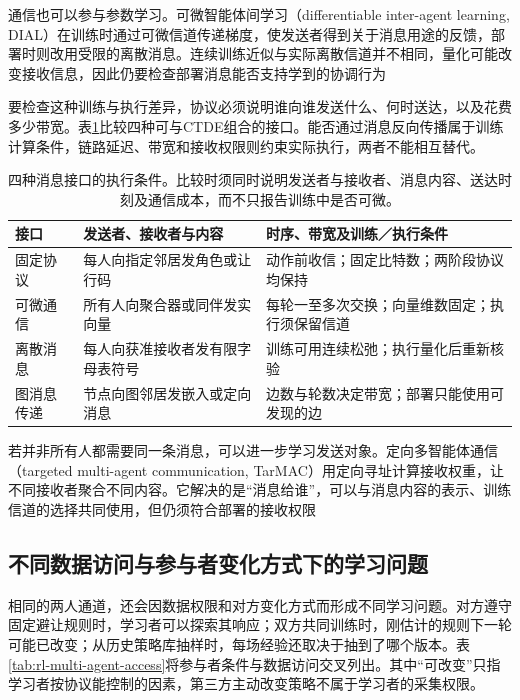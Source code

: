 通信也可以参与参数学习。可微智能体间学习（differentiable inter-agent learning, DIAL）在训练时通过可微信道传递梯度，使发送者得到关于消息用途的反馈，部署时则改用受限的离散消息。连续训练近似与实际离散信道并不相同，量化可能改变接收信息，因此仍要检查部署消息能否支持学到的协调行为

要检查这种训练与执行差异，协议必须说明谁向谁发送什么、何时送达，以及花费多少带宽。表\ref{tab:rl-multi-agent-communication}比较四种可与CTDE组合的接口。能否通过消息反向传播属于训练计算条件，链路延迟、带宽和接收权限则约束实际执行，两者不能相互替代。

\begin{table}[htbp]
 \centering
 \begin{tabularx}{\linewidth}{@{}l >{\raggedright\arraybackslash}X >{\raggedright\arraybackslash}X@{}}
 \toprule
 接口 & 发送者、接收者与内容 & 时序、带宽及训练／执行条件\\
 \midrule
 固定协议 & 每人向指定邻居发角色或让行码 & 动作前收信；固定比特数；两阶段协议均保持\\
 可微通信 & 所有人向聚合器或同伴发实向量 & 每轮一至多次交换；向量维数固定；执行须保留信道\\
 离散消息 & 每人向获准接收者发有限字母表符号 & 训练可用连续松弛；执行量化后重新核验\\
 图消息传递 & 节点向图邻居发嵌入或定向消息 & 边数与轮数决定带宽；部署只能使用可发现的边\\
 \bottomrule
 \end{tabularx}
 \caption{四种消息接口的执行条件。比较时须同时说明发送者与接收者、消息内容、送达时刻及通信成本，而不只报告训练中是否可微。}
 \label{tab:rl-multi-agent-communication}
\end{table}

若并非所有人都需要同一条消息，可以进一步学习发送对象。定向多智能体通信（targeted multi-agent communication, TarMAC）用定向寻址计算接收权重，让不同接收者聚合不同内容。它解决的是“消息给谁”，可以与消息内容的表示、训练信道的选择共同使用，但仍须符合部署的接收权限

\subsection{不同数据访问与参与者变化方式下的学习问题}
\label{sec:rl-multi-agent-access}

相同的两人通道，还会因数据权限和对方变化方式而形成不同学习问题。对方遵守固定避让规则时，学习者可以探索其响应；双方共同训练时，刚估计的规则下一轮可能已改变；从历史策略库抽样时，每场经验还取决于抽到了哪个版本。表\ref{tab:rl-multi-agent-access}将参与者条件与数据访问交叉列出。其中“可改变”只指学习者按协议能控制的因素，第三方主动改变策略不属于学习者的采集权限。

